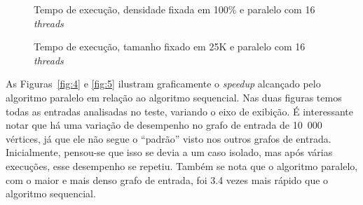 \documentclass[12pt]{article}
\begin{document}
\begin{figure}[H]
    \centering
    \begin{minipage}{.48\textwidth}
        \centering
        \resizebox{\textwidth}{!}
        {
		}
        \caption{Tempo de execução, densidade fixada em 100\% e paralelo com 16 \emph{threads}}
        \label{fig:2}
    \end{minipage}\hfill%
    \begin{minipage}{.48\textwidth}
        \centering
        \resizebox{\textwidth}{!}
        {
		}
        \caption{Tempo de execução, tamanho fixado em 25K e paralelo com 16 \emph{threads}}
        \label{fig:3}
    \end{minipage}
\end{figure}

As Figuras~\ref{fig:4} e \ref{fig:5} ilustram graficamente o \emph{speedup} alcançado pelo algoritmo paralelo em relação ao algoritmo sequencial. Nas duas figuras temos todas as entradas analisadas no teste, variando o eixo de exibição. É interessante notar que há uma variação de desempenho no grafo de entrada de 10~000 vértices, já  que ele não segue o “padrão” visto nos outros grafos de entrada. Inicialmente, pensou-se que isso se devia a um caso isolado, mas após várias execuções, esse desempenho se repetiu. Também se nota que o algoritmo paralelo, com o maior e mais denso grafo de entrada, foi 3.4 vezes mais rápido que o algoritmo sequencial.
\end{document}

